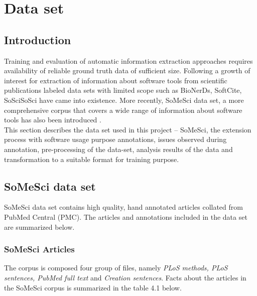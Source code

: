 \chapter{Data set}
\label{ch:dataset}
 
%
%
\section{Introduction}
\label{sec:dataset:intro}

Training and evaluation of automatic information extraction approaches requires availability of reliable ground truth data of sufficient size. Following a growth of interest for extraction of information about software tools from scientific publications labeled data sets with limited scope such as BioNerDs, SoftCite, SoSciSoSci have came into existence. More recently, \ac{SoMeSci} data set, a more comprehensive corpus that covers a wide range of information about software tools has also been introduced \citep{schindler2021somesci}.  \\

This section describes the data set used in this project – \ac{SoMeSci},  the extension process with software usage purpose annotations, issues observed during annotation, pre-processing of the data-set, analysis results of the data and transformation to a suitable format for training purpose.  





\section{SoMeSci data set}
\label{sec:dataset:SoMeSci}

SoMeSci data set contains high quality, hand annotated articles collated from PubMed Central (PMC). The articles and annotations included in the data set are summarized below.  

\subsection{ SoMeSci Articles }
\label{subsec:dataset:SoMeSci:Articles}

The corpus is composed four group of files, namely\emph{ PLoS methods, PLoS sentences, PubMed full text} and \emph{Creation sentences}. Facts about the articles in the \ac{SoMeSci} corpus is summarized in the table 4.1 below.

